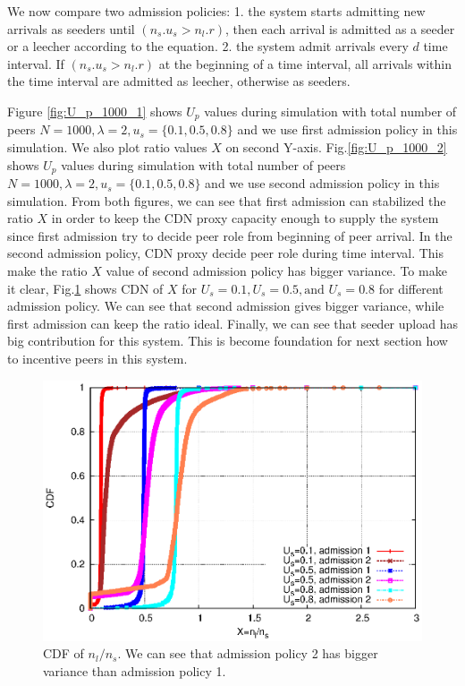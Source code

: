 \documentclass[paper]{ieice}
\begin{document}
We now compare two admission policies:
1. the system starts admitting new arrivals as seeders until $(n_s.u_s > n_l.r)$, then each arrival is admitted as a seeder or a leecher according to the equation.     
2. the system admit arrivals every $d$ time interval. If $(n_s.u_s > n_l.r)$ at the beginning of a time interval, all arrivals within the time interval are admitted as leecher, otherwise as seeders.

Figure \ref{fig:U_p_1000_1} shows $U_p$ values during simulation with total number of peers $N=1000, \lambda=2, u_s=\{0.1, 0.5, 0.8\}$ and we use first admission policy in this simulation. 
We also plot ratio values $X$ on second Y-axis.
Fig.\ref{fig:U_p_1000_2} shows $U_p$ values during simulation with total number of peers $N=1000, \lambda=2,  u_s=\{0.1, 0.5, 0.8\}$ and we use second admission policy in this simulation.  
From both figures, we can see that first admission can stabilized the ratio $X$ in order to keep the CDN proxy capacity enough to supply the system since first admission try to decide peer role from beginning of peer arrival. 
In the second admission policy, CDN proxy decide peer role during time interval.
This make the ratio $X$ value of second admission policy has bigger variance.
To make it clear, Fig.\ref{fig:cdf} shows CDN of $X$ for $U_s=0.1, U_s=0.5, \text{and }  U_s=0.8$ for different admission policy. 
We can see that second admission gives bigger variance, while first admission can keep the ratio ideal.
Finally, we can see that seeder upload has big contribution for this system. 
This is become foundation for next section how to incentive peers in this system.

\begin{figure}[hb] 
\begin{center}
\includegraphics[scale=0.6]{graphs/cdf.eps}
\end{center}
\caption{CDF of $n_l/n_s$. We can see that admission policy 2 has bigger variance than admission policy 1.}
\label{fig:cdf}
\vspace{-2mm}
\end{figure}
 
\end{document}
